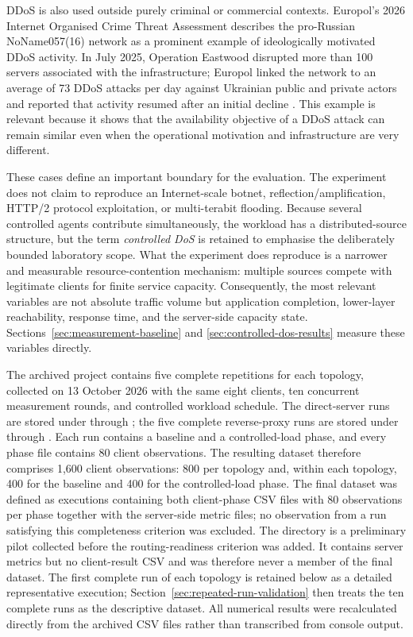 DDoS is also used outside purely criminal or commercial contexts. Europol's
2026 Internet Organised Crime Threat Assessment describes the pro-Russian
NoName057(16) network as a prominent example of ideologically motivated DDoS
activity. In July 2025, Operation Eastwood disrupted more than 100 servers
associated with the infrastructure; Europol linked the network to an average
of 73 DDoS attacks per day against Ukrainian public and private actors and
reported that activity resumed after an initial decline
\cite{europol_iocta_2026}. This example is relevant because it shows that the
availability objective of a DDoS attack can remain similar even when the
operational motivation and infrastructure are very different.

These cases define an important boundary for the evaluation. The experiment
does not claim to reproduce an Internet-scale botnet, reflection/amplification,
HTTP/2 protocol exploitation, or multi-terabit flooding. Because several
controlled agents contribute simultaneously, the workload has a
distributed-source structure, but the term \emph{controlled DoS} is retained
to emphasise the deliberately bounded laboratory scope. What the experiment
does reproduce is a narrower and measurable resource-contention mechanism:
multiple sources compete with legitimate clients for finite service capacity.
Consequently, the most relevant variables are not absolute traffic volume but
application completion, lower-layer reachability, response time, and the
server-side capacity state. Sections~\ref{sec:measurement-baseline} and
\ref{sec:controlled-dos-results} measure these variables directly.

The archived project contains five complete repetitions for each topology,
collected on 13 October 2026 with the same eight clients, ten concurrent
measurement rounds, and controlled workload schedule. The direct-server runs
are stored under  through
; the five complete reverse-proxy runs are stored under
 through
. Each run contains a baseline and a controlled-load
phase, and every phase file contains 80 client observations. The resulting
dataset therefore comprises 1,600 client observations: 800 per topology and,
within each topology, 400 for the baseline and 400 for the controlled-load
phase. The final dataset was defined as executions containing both client-phase
CSV files with 80 observations per phase together with the server-side metric
files; no observation from a run satisfying this completeness criterion was
excluded. The directory  is a
preliminary pilot collected before the routing-readiness criterion was added.
It contains server metrics but no client-result CSV and was therefore never a
member of the final dataset. The first complete run of each topology is
retained below as a detailed representative execution;
Section~\ref{sec:repeated-run-validation} then treats the ten complete runs as
the descriptive dataset. All numerical results were recalculated directly from
the archived CSV files rather than transcribed from console output.

